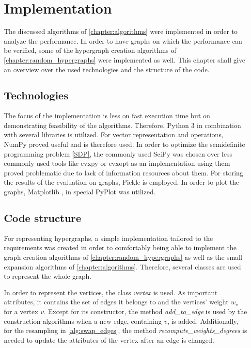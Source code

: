 \chapter{Implementation}\label{chapter:implementation}

The discussed algorithms of \cref{chapter:algorithms} were implemented in order to analyze the performance. In order to have graphs on which the performance can be verified, some of the hypergraph creation algorithms of \cref{chapter:random_hypergraphs} were implemented as well. This chapter shall give an overview over the used technologies and the structure of the code.

\section{Technologies}
The focus of the implementation is less on fast execution time but on demonstrating feasibility of the algorithms. Therefore, Python 3 in combination with several libraries is utilized.
For vector representation and operations, NumPy \cite{numpy} proved useful and is therefore used. In order to optimize the semidefinite programming problem \cref{SDP}, the commonly used SciPy \cite{scipy} was chosen over less commonly used tools like cvxpy or cvxopt as an implementation using them proved problematic due to lack of information resources about them.
For storing the results of the evaluation on graphs, Pickle is employed. In order to plot the graphs, Matplotlib \cite{matplotlib}, in special PyPlot was utilized.



\section{Code structure}
For representing hypergraphs, a simple implementation tailored to the requirements was created in order to comfortably being able to implement the graph creation algorithms of \cref{chapter:random_hypergraphs} as well as the small expansion algorithms of \cref{chapter:algorithms}.
Therefore, several classes are used to represent the whole graph.

In order to represent the vertices, the class \textit{vertex} is used. As important attributes, it contains the set of edges it belongs to and the vertices' weight $w_v$ for a vertex $v$. Except for its constructor, the method \textit{add\_to\_edge} is used by the construction algorithms when a new edge, containing $v$, is added. Additionally, for the resampling in \cref{alg:swap_edges}, the method \textit{recompute\_weights\_degrees} is needed to update the attributes of the vertex after an edge is changed.

